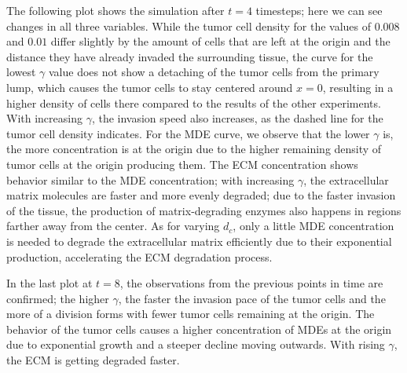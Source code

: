 The following plot shows the simulation after $t=4$ timesteps; here we can see changes in all three variables. While the tumor cell density for the values of $0.008$ and $0.01$ differ slightly by the amount of cells that are left at the origin and the distance they have already invaded the surrounding tissue, the curve for the lowest $\gamma$ value does not show a detaching of the tumor cells from the primary lump, which causes the tumor cells to stay centered around $x=0$, resulting in a higher density of cells there compared to the results of the other experiments. With increasing $\gamma$, the invasion speed also increases, as the dashed line for the tumor cell density indicates. For the MDE curve, we observe that the lower $\gamma$ is, the more concentration is at the origin due to the higher remaining density of tumor cells at the origin producing them. The ECM concentration shows behavior similar to the MDE concentration; with increasing $\gamma$, the extracellular matrix molecules are faster and more evenly degraded; due to the faster invasion of the tissue, the production of matrix-degrading enzymes also happens in regions farther away from the center. As for varying $d_c$, only a little MDE concentration is needed to degrade the extracellular matrix efficiently due to their exponential production, accelerating the ECM degradation process.

In the last plot at $t=8$, the observations from the previous points in time are confirmed; the higher $\gamma$, the faster the invasion pace of the tumor cells and the more of a division forms with fewer tumor cells remaining at the origin. The behavior of the tumor cells causes a higher concentration of MDEs at the origin due to exponential growth and a steeper decline moving outwards. With rising $\gamma$, the ECM is getting degraded faster.

